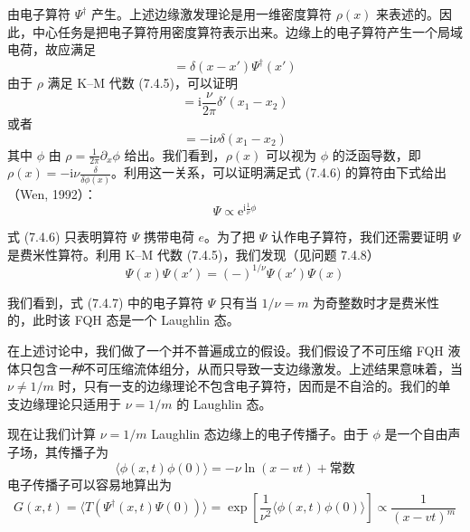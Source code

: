 由电子算符 $\Psi^\dagger$ 产生。上述边缘激发理论是用一维密度算符 $\rho(x)$ 来表述的。因此，中心任务是把电子算符用密度算符表示出来。边缘上的电子算符产生一个局域电荷，故应满足
\begin{equation*}
[\rho(x),\Psi^\dagger(x')]=\delta(x-x')\Psi^\dagger(x')
\tag{7.4.6}
\end{equation*}
由于 $\rho$ 满足 K--M 代数 (7.4.5)，可以证明
\begin{equation*}
[\rho(x_1),\rho(x_2)]=\mathrm{i}\frac{\nu}{2\pi}\delta'(x_1-x_2)
\end{equation*}
或者
\begin{equation*}
[\rho(x_1),\phi(x_2)]=-\mathrm{i}\nu\delta(x_1-x_2)
\end{equation*}
其中 $\phi$ 由 $\rho=\frac{1}{2\pi}\partial_x\phi$ 给出。我们看到，$\rho(x)$ 可以视为 $\phi$ 的泛函导数，即 $\rho(x)=-\mathrm{i}\nu\frac{\delta}{\delta\phi(x)}$。利用这一关系，可以证明满足式 (7.4.6) 的算符由下式给出（Wen, 1992）：
\begin{equation*}
\Psi\propto\mathrm{e}^{\mathrm{i}\frac{1}{\nu}\phi}
\tag{7.4.7}
\end{equation*}

式 (7.4.6) 只表明算符 $\Psi$ 携带电荷 $e$。为了把 $\Psi$ 认作电子算符，我们还需要证明 $\Psi$ 是费米性算符。利用 K--M 代数 (7.4.5)，我们发现（见问题 7.4.8）
\begin{equation*}
\Psi(x)\Psi(x')=(-)^{1/\nu}\Psi(x')\Psi(x)
\tag{7.4.8}
\end{equation*}

我们看到，式 (7.4.7) 中的电子算符 $\Psi$ 只有当 $1/\nu=m$ 为奇整数时才是费米性的，此时该 FQH 态是一个 Laughlin 态。

在上述讨论中，我们做了一个并不普遍成立的假设。我们假设了不可压缩 FQH 液体只包含\emph{一种}不可压缩流体组分，从而只导致一支边缘激发。上述结果意味着，当 $\nu\neq1/m$ 时，只有一支的边缘理论不包含电子算符，因而是不自洽的。我们的单支边缘理论只适用于 $\nu=1/m$ 的 Laughlin 态。

现在让我们计算 $\nu=1/m$ Laughlin 态边缘上的电子传播子。由于 $\phi$ 是一个自由声子场，其传播子为
\begin{equation*}
\langle\phi(x,t)\phi(0)\rangle=-\nu\ln(x-vt)+\text{常数}
\end{equation*}
电子传播子可以容易地算出为
\begin{equation*}
G(x,t)=\langle T(\Psi^\dagger(x,t)\Psi(0))\rangle=\exp[\frac{1}{\nu^2}\langle\phi(x,t)\phi(0)\rangle]\propto\frac{1}{(x-vt)^m}
\tag{7.4.9}
\end{equation*}

